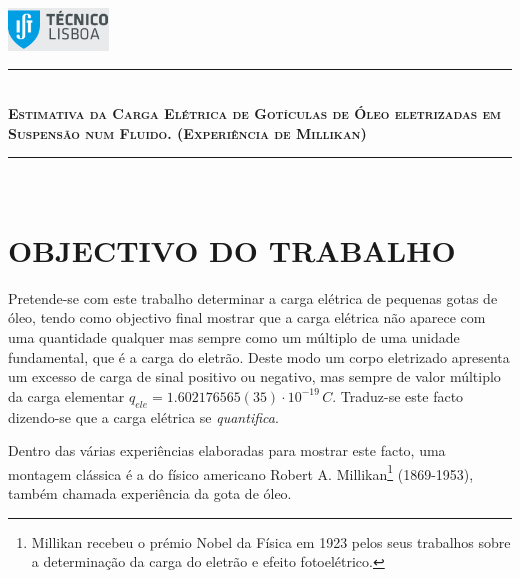 \documentclass[a4paper,twoside,12pt]{article}      %
\author{Prof. Bernardo B. Carvalho}
\date{ Setembro 2012}
\newcommand{\HRule}{\rule{\linewidth}{0.5mm}}
\begin{document}
 

	\includegraphics[width=0.2\textwidth]{../logo-ist}%

		\HRule \\[0.5cm]
	{ \large \bfseries   \textsc{Estimativa da Carga Elétrica de 
		Gotículas de Óleo eletrizadas em Suspensão num Fluido. (Experiência de Millikan)} }\\[0.4cm] %
	\HRule \\%




\section{\sf OBJECTIVO DO TRABALHO}
Pretende-se com este trabalho determinar a carga elétrica de pequenas gotas de óleo, tendo como objectivo final mostrar que a carga elétrica não aparece com uma quantidade qualquer mas sempre como um múltiplo de uma unidade fundamental, que é a carga do eletrão. Deste modo um corpo eletrizado apresenta um excesso de carga de sinal positivo ou negativo, mas sempre de valor múltiplo da carga elementar $q_{ele}= 1.602176565(35)\cdot 10^{-19}\,C$.
Traduz-se este facto dizendo-se que a carga elétrica se \emph{quantifica}.

Dentro das várias experiências elaboradas para mostrar este facto, uma montagem clássica é a do físico americano Robert A. Millikan\footnote{Millikan recebeu o prémio Nobel da Física em 1923 pelos seus trabalhos sobre a determinação da carga do eletrão e efeito fotoelétrico.} (1869-1953), também chamada experiência da gota de óleo.
\end{document}
